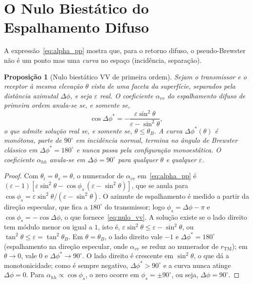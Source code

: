 \documentclass[12pt,a4paper,oneside]{book}
\theoremstyle{remark}
\theoremstyle{plain}
\newtheorem{proposicao}{Proposição}[chapter]
\theoremstyle{definition}
\begin{document}
\section{O Nulo Biestático do Espalhamento Difuso}
\label{sec:sup_nulo}

A expressão~\eqref{eq:alpha_pp} mostra que, para o retorno difuso, o
pseudo-Brewster não é um ponto mas uma \emph{curva} no espaço
(incidência, separação).

\begin{proposicao}[Nulo biestático VV de primeira ordem]
\label{prop:nulo_vv}
Sejam o transmissor e o receptor à mesma elevação $\theta$ vista de uma faceta
da superfície, separados pela distância azimutal $\Delta\phi$, e seja
$\varepsilon$ real. O coeficiente $\alpha_{vv}$ do espalhamento difuso de
primeira ordem anula-se se, e somente se,
\begin{equation}
  \boxed{\cos\Delta\phi^\ast = -\frac{\varepsilon\sin^2\theta}{\varepsilon-\sin^2\theta}},
  \label{eq:nulo_vv}
\end{equation}
o que admite solução real se, e somente se, $\theta\le\theta_B$. A curva
$\Delta\phi^\ast(\theta)$ é monótona, parte de $90^\circ$ em incidência normal,
termina no ângulo de Brewster clássico em $\Delta\phi^\ast=180^\circ$ e nunca
passa pela configuração monoestática. O coeficiente $\alpha_{hh}$ anula-se em
$\Delta\phi=90^\circ$ para qualquer $\theta$ e qualquer $\varepsilon$.
\end{proposicao}

\begin{proof}
Com $\theta_i=\theta_s=\theta$, o numerador de $\alpha_{vv}$
em~\eqref{eq:alpha_pp} é
$(\varepsilon-1)[\varepsilon\sin^2\theta-\cos\phi_s\,(\varepsilon-\sin^2\theta)]$,
que se anula para $\cos\phi_s=\varepsilon\sin^2\theta/(\varepsilon-\sin^2\theta)$.
O azimute de espalhamento é medido a partir da direção especular, que fica a
$180^\circ$ do transmissor; logo $\phi_s=\Delta\phi-\pi$ e
$\cos\phi_s=-\cos\Delta\phi$, o que fornece~\eqref{eq:nulo_vv}. A solução existe
se o lado direito tem módulo menor ou igual a $1$, isto é,
$\varepsilon\sin^2\theta\le\varepsilon-\sin^2\theta$, ou
$\tan^2\theta\le\varepsilon=\tan^2\theta_B$. Em $\theta=\theta_B$, o lado direito vale
$-1$ e $\Delta\phi^\ast=180^\circ$ (espalhamento na direção especular, onde
$\alpha_{vv}$ se reduz ao numerador de $r_{\text{TM}}$); em $\theta\to0$, vale
$0$ e $\Delta\phi^\ast\to90^\circ$. O lado direito é crescente em $\sin^2\theta$,
o que dá a monotonicidade; como é sempre negativo, $\Delta\phi^\ast>90^\circ$ e a
curva nunca atinge $\Delta\phi=0$. Para $\alpha_{hh}\propto\cos\phi_s$, o zero
ocorre em $\phi_s=\pm90^\circ$, ou seja, $\Delta\phi=90^\circ$.
\end{proof}
\end{document}
